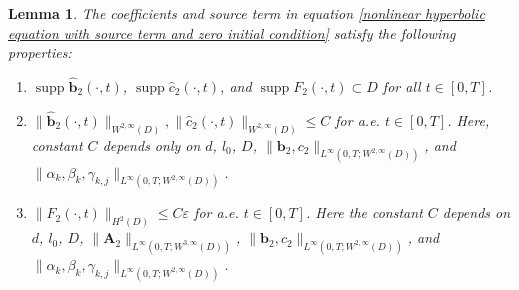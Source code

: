 \documentclass[11pt,reqno,oneside]{amsart}
\numberwithin{equation}{section}
\newtheorem{lemma}[theorem]{Lemma}
\theoremstyle{definition}
\theoremstyle{remark}
\numberwithin{equation}{section}
\begin{document}
	\begin{lemma}\label{Lemma 5.1}
		The coefficients and source term in equation \eqref{nonlinear hyperbolic equation with source term and zero initial condition} satisfy the following properties:
		\begin{enumerate}
			\item $\operatorname{supp} \hat{\mathbf{b}}_2(\cdot, t)$, $\operatorname{supp} \hat{c}_2(\cdot, t)$, and $\operatorname{supp} F_2(\cdot, t) \subset D$ for all $t \in [0, T]$.
			\item 
			$
			\|\hat{\mathbf{b}}_2(\cdot, t)\|_{W^{2,\infty}(D)}, \|\hat{c}_2(\cdot, t)\|_{W^{2,\infty}(D)}\leqslant C
			$ for a.e. $t \in [0, T]$.
			Here, constant $C$ depends only on $d$, $l_0$, $D$, $\|\mathbf{b}_2, c_2\|_{L^{\infty}(0,T; W^{2,\infty}(D))}$, and $\| \alpha_k, \beta_k, \gamma_{k,j}\|_{L^{\infty}(0,T; W^{2,\infty}(D))}$.
			\item $
			\|F_2(\cdot, t)\|_{H^{2}(D)} \leqslant C \varepsilon$ 
			for a.e. $t \in [0, T]$. Here the constant $C$ depends on $d$, $l_0$, $D$, $\|\mathbf{A}_2\|_{L^{\infty}(0,T; W^{3,\infty}(D))}$, $\|\mathbf{b}_2, c_2\|_{L^{\infty}(0,T; W^{2,\infty}(D))}$, and $\|\alpha_k, \beta_k, \gamma_{k,j}\|_{L^{\infty}(0,T; W^{2,\infty}(D))}$.
		\end{enumerate}
	\end{lemma}
	
\end{document}
